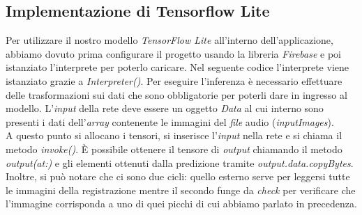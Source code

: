 \subsection{Implementazione di Tensorflow Lite}
Per utilizzare il nostro modello \textit{TensorFlow Lite} all'interno dell'applicazione, abbiamo dovuto prima configurare il progetto usando la libreria \textit{Firebase} e poi istanziato l'interprete per poterlo caricare. Nel seguente codice l'interprete viene istanziato grazie a \textit{Interpreter()}.
\vspace*{2ex}
\vspace*{2ex}
\noindent Per eseguire l'inferenza è necessario effettuare delle trasformazioni sui dati che sono obbligatorie per poterli dare in ingresso al modello. L'\textit{input} della rete deve essere un oggetto \textit{Data} al cui interno sono presenti i dati dell'\textit{array} contenente le immagini del \textit{file} audio (\textit{inputImages}).\\
A questo punto si allocano i tensori, si inserisce l'\textit{input} nella rete e si chiama il metodo \textit{invoke()}.
È possibile ottenere il tensore di \textit{output} chiamando il metodo \textit{output(at:)} e gli elementi ottenuti dalla predizione tramite \textit{output.data.copyBytes}. Inoltre, si può notare che ci sono due cicli: quello esterno serve per leggersi tutte le immagini della registrazione mentre il secondo funge da \textit{check} per verificare che l'immagine corrisponda a uno di quei picchi di cui abbiamo parlato in precedenza.
\vspace*{2ex}
